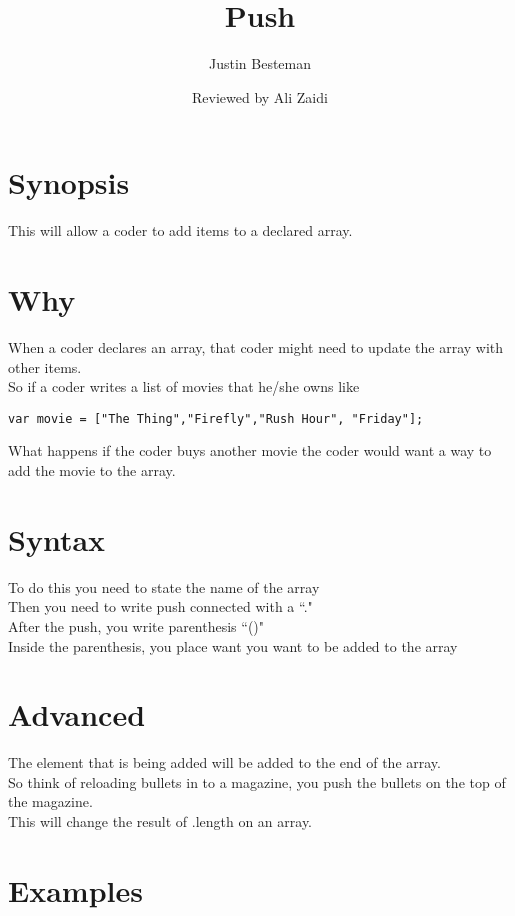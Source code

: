 \documentclass[12pt, letterpaper]{article}
\title{Push}
\author{Justin Besteman}
\date{Reviewed by Ali Zaidi}
\begin{document}
\maketitle

\section*{Synopsis}

This will allow a coder to add items to a declared array.

\section*{Why}

When a coder declares an array, that coder might need to update the array with other items. \\
So if a coder writes a list of movies that he/she owns like\\
\begin{lstlisting}
var movie = ["The Thing","Firefly","Rush Hour", "Friday"];
\end{lstlisting}
What happens if the coder buys another movie the coder would want a way to add the movie to the array.
\section*{Syntax}
To do this you need to state the name of the array\\
Then you need to write push connected with a ``." \\
After the push, you write parenthesis ``()"\\
Inside the parenthesis, you place want you want to be added to the array
\section*{Advanced}

The element that is being added will be added to the end of the array. \\
So think of reloading bullets in to a magazine, you push the bullets on the top of the magazine.\\
This will change the result of .length on an array. 

\section*{Examples}
\end{document}
